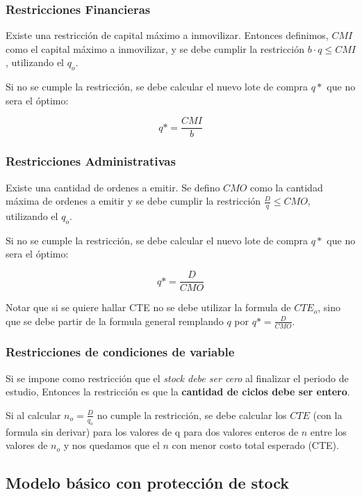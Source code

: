 \documentclass{article}
\begin{document}
\subsubsection{Restricciones Financieras}
Existe una restricción de capital máximo a inmovilizar. Entonces definimos, \(CMI\) como el capital máximo a inmovilizar,
y se debe cumplir la restricción \(b \cdot q \leq CMI\), utilizando el \(q_o\).

Si no se cumple la restricción, se debe calcular el nuevo lote de compra \(q*\) que no sera el óptimo:

\begin{equation}
    q* = \frac{CMI}{b}
\end{equation}

\subsubsection{Restricciones Administrativas}
Existe una cantidad de ordenes a emitir. Se defino \(CMO\) como la cantidad máxima de ordenes a emitir y 
se debe cumplir la restricción \(\frac{D}{q} \leq CMO\), utilizando el \(q_o\).

Si no se cumple la restricción, se debe calcular el nuevo lote de compra \(q*\) que no sera el óptimo:

\begin{equation}
    q* = \frac{D}{CMO}
\end{equation}

Notar que si se quiere hallar CTE no se debe utilizar la formula de \(CTE_o\), sino que se debe partir de la formula general
remplando \(q\) por \(q*=\frac{D}{CMO}\).

\subsubsection{Restricciones de condiciones de variable}

Si se impone como restricción que el \textit{stock debe ser cero} al finalizar el periodo de estudio,
Entonces la restricción es que la \textbf{cantidad de ciclos debe ser entero}.

Si al calcular \(n_o = \frac{D}{q_o}\) no cumple la restricción, se debe calcular los \(CTE\) (con la formula sin derivar) para los valores
de q para dos valores enteros de \(n\) entre los valores de \(n_o\) y nos quedamos que el \(n\) con menor costo total esperado (CTE).


\newpage
\subsection{Modelo básico con protección de stock}
\end{document}
